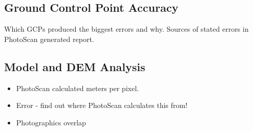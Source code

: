 \subsection{Ground Control Point Accuracy}

Which GCPs produced the biggest errors and why. Sources of stated errors in
PhotoScan generated report.

\subsection{Model and DEM Analysis}

\begin{itemize}

    \item PhotoScan calculated meters per pixel.

    \item Error - find out where PhotoScan calculates this from!

    \item Photographics overlap

\end{itemize}
